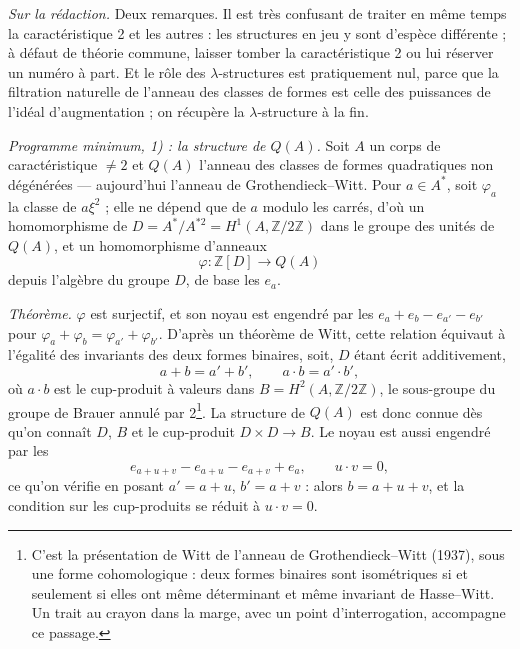 \documentclass[11pt,a4paper]{article}
\begin{document}
\emph{Sur la rédaction.} Deux remarques. Il est très confusant de traiter en même
temps la caractéristique 2 et les autres : les structures en jeu y sont
d'espèce différente ; à défaut de théorie commune, laisser tomber la
caractéristique 2 ou lui réserver un numéro à part. Et le rôle des
$\lambda$-structures est pratiquement nul, parce que la filtration naturelle de
l'anneau des classes de formes est celle des puissances de l'idéal
d'augmentation ; on récupère la $\lambda$-structure à la fin.

\emph{Programme minimum, 1) : la structure de $Q(A)$.} Soit $A$ un corps de
caractéristique $\neq 2$ et $Q(A)$ l'anneau des classes de formes quadratiques
non dégénérées — aujourd'hui l'anneau de Grothendieck--Witt. Pour
$a \in A^{*}$, soit $\varphi_a$ la classe de $a\xi^2$ ; elle ne dépend que de $a$
modulo les carrés, d'où un homomorphisme de $D = A^{*}/A^{*2} = H^1(A,
\mathbb{Z}/2\mathbb{Z})$ dans le groupe des unités de $Q(A)$, et un homomorphisme
d'anneaux
\[
\varphi : \mathbb{Z}[D] \longrightarrow Q(A)
\]
depuis l'algèbre du groupe $D$, de base les $e_a$.

\emph{Théorème.} $\varphi$ est surjectif, et son noyau est engendré par les
$e_a + e_b - e_{a'} - e_{b'}$ pour $\varphi_a + \varphi_b = \varphi_{a'} + \varphi_{b'}$.
D'après un théorème de Witt, cette relation équivaut à l'égalité des invariants
des deux formes binaires, soit, $D$ étant écrit additivement,
\[
a + b = a' + b', \qquad a \cdot b = a' \cdot b',
\]
où $a \cdot b$ est le cup-produit à valeurs dans $B = H^2(A, \mathbb{Z}/2\mathbb{Z})$,
le sous-groupe du groupe de Brauer annulé par 2\footnote{C'est la présentation de
Witt de l'anneau de Grothendieck--Witt (1937), sous une forme cohomologique : deux
formes binaires sont isométriques si et seulement si elles ont même déterminant
et même invariant de Hasse--Witt. Un trait au crayon dans la marge, avec un point
d'interrogation, accompagne ce passage.}. La structure de $Q(A)$ est donc connue
dès qu'on connaît $D$, $B$ et le cup-produit $D \times D \to B$. Le noyau est aussi
engendré par les
\[
e_{a+u+v} - e_{a+u} - e_{a+v} + e_a, \qquad u \cdot v = 0,
\]
ce qu'on vérifie en posant $a' = a + u$, $b' = a + v$ : alors $b = a + u + v$, et la
condition sur les cup-produits se réduit à $u \cdot v = 0$.
\end{document}
